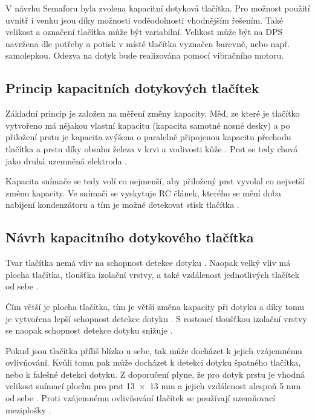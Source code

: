 V návrhu Semaforu byla zvolena kapacitní dotyková tlačítka. Pro možnost použití uvnitř i venku jsou díky možnosti voděodolnosti 
vhodnějším řešením. Také velikost a označení tlačítka může být variabilní. Velikost může být na DPS navržena dle potřeby a potisk
v místě tlačítka vyznačen barevně, nebo např. samolepkou. Odezva na dotyk bude realizována pomocí vibračního motoru.

\subsection{Princip kapacitních dotykových tlačítek}
Základní princip je založen na měření změny kapacity. Měď, ze které je tlačítko vytvořeno má
nějakou vlastní kapacitu (kapacita samotné nosné desky) a po přiložení prstu je kapacita zvýšena o paralelně 
připojenou kapacitu přechodu tlačítka a prstu díky obsahu železa v krvi a vodivosti kůže \cite{PrincipKapTl}. 
Prst se tedy chová jako druhá uzemněná elektroda \cite{PrincipKapTl}. 

Kapacita snímače se tedy volí co nejmenší, aby přiložený prst vyvolal co nejvetší změnu kapacity. Ve snímači se vyskytuje
RC článek, kterého se mění doba nabíjení kondenzátoru a tím je možné detekovat stisk tlačítka \cite{PrincipKapTl}. 

\subsection{Návrh kapacitního dotykového tlačítka}
Tvar tlačítka nemá vliv na schopnost detekce dotyku \cite{PrincipKapTl}. Naopak velký vliv má plocha tlačítka, tloušťka
izolační vrstvy, a také vzdálenost jednotlivých tlačítek od sebe \cite{PrincipKapTl}. 

Čím větší je plocha tlačítka, tím je větší změna kapacity při dotyku a díky tomu je vytvořena lepší schopnost detekce 
dotyku \cite{PrincipKapTl}. S rostoucí tloušťkou izolační vrstvy se naopak schopnost detekce dotyku snižuje \cite{PrincipKapTl}.

Pokud jsou tlačítka příliš blízko u sebe, tak může docházet k jejich vzájemnému ovlivňování. Kvůli tomu pak může docházet k
detekci dotyku špatného tlačítka, nebo k falešné detekci dotyku. Z doporučení plyne, že pro dotyk prstu je vhodná velikost snímací 
plochu pro prst 13~$\times$~13 mm a jejich vzdálenost alespoň 5 mm od sebe \cite{PrincipKapTl}. Proti vzájemnému ovlivňování tlačítek
se používají uzemňovací meziplošky \cite{PrincipKapTl}. 


